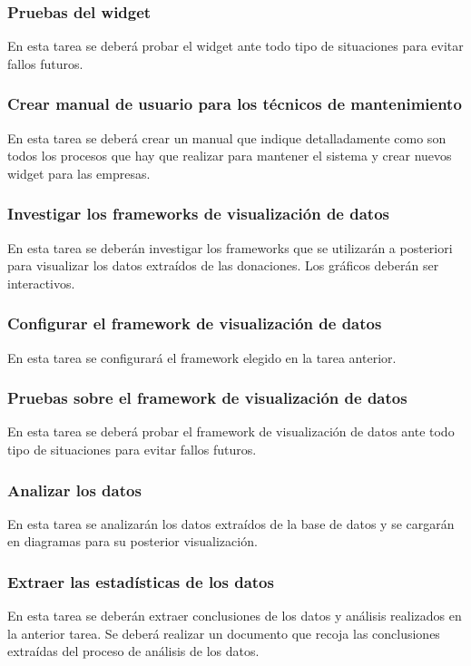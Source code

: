 \subsubsection{Pruebas del widget}
En esta tarea se deberá probar el widget ante todo tipo de situaciones para evitar fallos futuros.

\subsubsection{Crear manual de usuario para los técnicos de mantenimiento}
En esta tarea se deberá crear un manual que indique detalladamente como son todos los procesos que hay que realizar para mantener el sistema y crear nuevos widget para las empresas.

\subsubsection{Investigar los frameworks de visualización de datos}
En esta tarea se deberán investigar los frameworks que se utilizarán a posteriori para visualizar los datos extraídos de las donaciones. Los gráficos deberán ser interactivos.

\subsubsection{Configurar el framework de visualización de datos}
En esta tarea se configurará el framework elegido en la tarea anterior.

\subsubsection{Pruebas sobre el framework de visualización de datos}
En esta tarea se deberá probar el framework de visualización de datos ante todo tipo de situaciones para evitar fallos futuros.

\subsubsection{Analizar los datos}
En esta tarea se analizarán los datos extraídos de la base de datos y se cargarán en diagramas para su posterior visualización.

\subsubsection{Extraer las estadísticas de los datos}
En esta tarea se deberán extraer conclusiones de los datos y análisis realizados en la anterior tarea. Se deberá realizar un documento que recoja las conclusiones extraídas del proceso de análisis de los datos.


